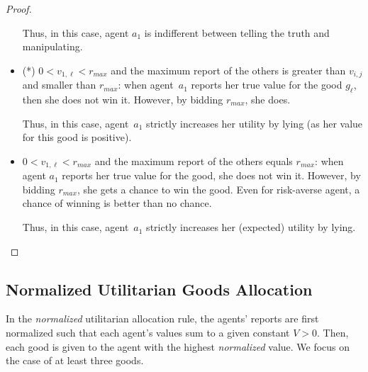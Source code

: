 \begin{proof}
\begin{itemize}
        Thus, in this case, agent $a_1$ is indifferent between telling the truth and manipulating.

        
        \item (*) $0 < v_{1,\ell} < r_{max}$ and the maximum report of the others is greater than $v_{i,j}$ and smaller than $r_{max}$: when agent~$a_1$ reports her true value for the good $g_{\ell}$, then she does not win it. However, by bidding $r_{max}$, she does. 

        Thus, in this case, agent~$a_1$ strictly increases her utility by lying (as her value for this good is positive).

        

        \item $0 < v_{1,\ell} < r_{max}$ and the maximum report of the others equals $r_{max}$: 
        when agent $a_1$ reports her true value for the good, she does not win it. 
        However, by bidding $r_{max}$, she gets a chance to win the good. 
        Even for risk-averse agent, a chance of winning is better than no chance.

        Thus, in this case, agent~$a_1$ strictly increases her (expected) utility by lying.
    \end{itemize}
\end{proof}



\subsection{Normalized Utilitarian Goods Allocation}\label{sec:normalized-utilitarian-alloc}

In the \emph{normalized} utilitarian allocation rule, the agents' reports are first normalized such that each agent's values sum to a given constant $V >0$.
Then, each good is given to the agent with the highest \emph{normalized} value.
%
We focus on the case of at least three goods.

